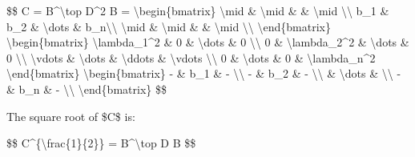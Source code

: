 \$\$ C = B\^{}\textbackslash top D\^{}2 B = \textbackslash begin\{bmatrix\} \textbackslash mid \& \textbackslash mid \& \& \textbackslash mid \textbackslash\textbackslash{} b\_1 \& b\_2 \& \textbackslash dots \& b\_n\textbackslash\textbackslash{} \textbackslash mid \& \textbackslash mid \& \& \textbackslash mid \textbackslash\textbackslash{} \textbackslash end\{bmatrix\} \textbackslash begin\{bmatrix\} \textbackslash lambda\_1\^{}2 \& 0 \& \textbackslash dots \& 0 \textbackslash\textbackslash{} 0 \& \textbackslash lambda\_2\^{}2 \& \textbackslash dots \& 0 \textbackslash\textbackslash{} \textbackslash vdots \& \textbackslash dots \& \textbackslash ddots \& \textbackslash vdots \textbackslash\textbackslash{} 0 \& \textbackslash dots \& 0 \& \textbackslash lambda\_n\^{}2 \textbackslash end\{bmatrix\} \textbackslash begin\{bmatrix\} - \& b\_1 \& - \textbackslash\textbackslash{} - \& b\_2 \& - \textbackslash\textbackslash{} \& \textbackslash dots \& \textbackslash\textbackslash{} - \& b\_n \& - \textbackslash\textbackslash{} \textbackslash end\{bmatrix\} \$\$

The square root of \$C\$ is:

\$\$ C\^{}\{\textbackslash frac\{1\}\{2\}\} = B\^{}\textbackslash top D B \$\$

